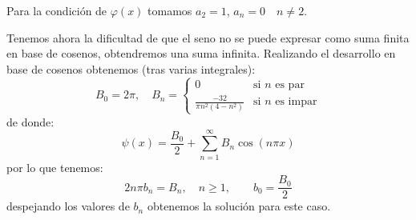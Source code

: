 \begin{ejemplo}
\begin{enumerate}[label=\alph*)]
            Para la condición de $\varphi(x)$ tomamos $a_2 = 1$, $a_n = 0 \quad n\neq 2$.

            Tenemos ahora la dificultad de que el seno no se puede expresar como suma finita en base de cosenos, obtendremos una suma infinita. Realizando el desarrollo en base de cosenos obtenemos (tras varias integrales):
            \begin{equation*}
                B_0 = 2\pi, \quad B_n = \left\{\begin{array}{ll}
                    0 & \text{si\ } n \text{\ es par} \\
                     \frac{-32}{\pi n^2(4-n^2)}& \text{si\ } n \text{\ es impar}
                \end{array}\right. 
            \end{equation*}
            de donde:
            \begin{equation*}
                \psi(x) = \frac{B_0}{2} + \sum_{n=1}^{\infty} B_n \cos(n\pi x)
            \end{equation*}
            por lo que tenemos:
            \begin{equation*}
                2n\pi b_n = B_n, \quad n\geq 1,\qquad  b_0 = \frac{B_0}{2}
            \end{equation*}
            despejando los valores de $b_n$ obtenemos la solución para este caso.
    \end{enumerate}
\end{ejemplo}
